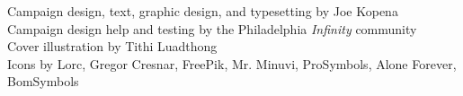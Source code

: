 
\noindent
Campaign design, text, graphic design, and typesetting by Joe Kopena\\
Campaign design help and testing by the Philadelphia \textit{Infinity} community\\
Cover illustration by Tithi Luadthong\\
Icons by Lorc, Gregor Cresnar, FreePik, Mr. Minuvi, ProSymbols, Alone
Forever, BomSymbols
